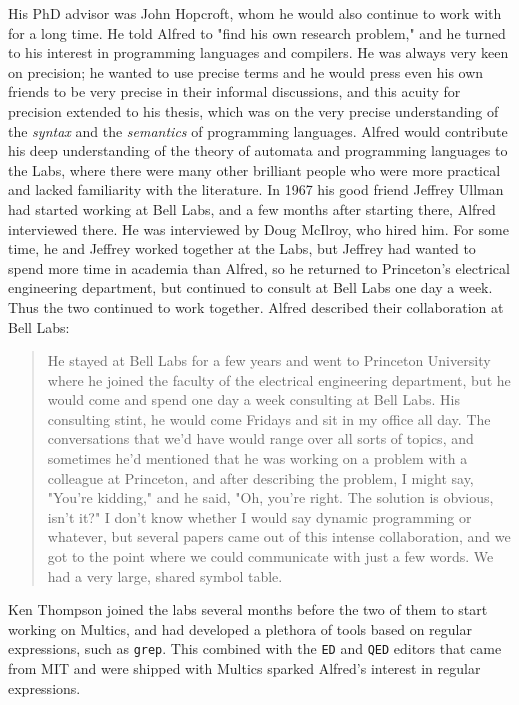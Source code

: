 His PhD advisor was John Hopcroft, whom he would also continue to work with for a long time.
He told Alfred to "find his own research problem," and he turned to his interest in
programming languages and compilers.
He was always very keen on precision; he wanted to use precise terms and he would
press even his own friends to be very precise in their informal discussions, and
this acuity for precision extended to his thesis, which was on the very precise
understanding of the \textit{syntax} and the \textit{semantics} of programming languages.
Alfred would contribute his deep understanding of the theory of automata and programming
languages to the Labs, where there were many other brilliant people who were more practical
and lacked familiarity with the literature.
In 1967 his good friend Jeffrey Ullman had started working at Bell Labs, and a few months
after starting there, Alfred interviewed there.
He was interviewed by Doug McIlroy, who hired him.
For some time, he and Jeffrey worked together at the Labs, but Jeffrey had wanted to
spend more time in academia than Alfred, so he returned to Princeton's electrical
engineering department, but continued to consult at Bell Labs one day a week.
Thus the two continued to work together.
Alfred described their collaboration at Bell Labs:

\begin{quotation}
	He stayed at Bell Labs for a few years and went to Princeton University where he
	joined the faculty of the electrical engineering department, but he would come and spend one day a
	week consulting at Bell Labs. His consulting stint, he would come Fridays and sit in my office
	all day. The conversations that we'd have would range over all sorts of topics, and sometimes he'd
	mentioned that he was working on a problem with a colleague at Princeton, and after describing the
	problem, I might say, "You're kidding," and he said, "Oh, you're right. The solution is obvious,
	isn't it?" I don't know whether I would say dynamic programming or whatever, but several papers
	came out of this intense collaboration, and we got to the point where we could communicate with just
	a few words. We had a very large, shared symbol table.
	\cite{aho_oral_history_2022}
\end{quotation}

Ken Thompson joined the labs several months before the two of them to
start working on Multics, and had developed a plethora of tools based on
regular expressions, such as \texttt{grep}.
This combined with the \texttt{ED} and \texttt{QED} editors that came from MIT
and were shipped with Multics sparked Alfred's interest in regular expressions.

